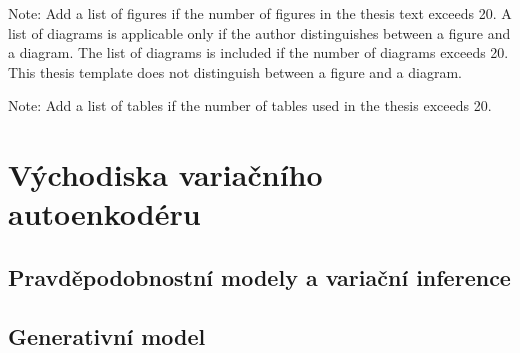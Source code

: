 \documentclass[11pt,a4paper]{report}
\let\openright=\clearpage
\begin{document}


\setcounter{tocdepth}{2}
\tableofcontents

\openright
\listoffigures
Note: Add a list of figures if the number of figures in the thesis text exceeds 20. A list of diagrams is applicable only if the author distinguishes between a figure and a diagram. The list of diagrams is included if the number of diagrams exceeds 20. This thesis template does not distinguish between a figure and a diagram.

\clearpage
\listoftables
Note: Add a list of tables if the number of tables used in the thesis exceeds 20. 



\pagestyle{fancyx}
{%
\pagestyle{plain}

}

\chapter{Východiska variačního autoenkodéru}









\section{Pravděpodobnostní modely a variační inference}
\label{sec:probabilistic_models_variational_inference}

\section{Generativní model}
\label{sec:generative_model}
\end{document}
